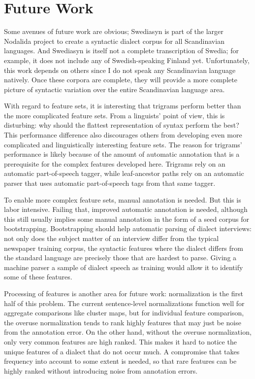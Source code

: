 \section{Future Work}

Some avenues of future work are obvious; Swediasyn is part of the
larger Nodalida project to create a syntactic dialect corpus for all
Scandinavian languages. And Swediasyn is itself not a complete
transcription of Swedia; for example, it does not include any of
Swedish-speaking Finland yet. Unfortunately, this work depends on
others since I do not speak any Scandinavian language natively. Once
these corpora are complete, they will provide a more complete picture
of syntactic variation over the entire Scandinavian language area.

With regard to feature sets, it is interesting that trigrams perform better
than the more complicated feature sets. From a linguists' point of
view, this is disturbing: why should the flattest representation of
syntax perform the best? This performance difference also
discourages others from developing even more complicated and
linguistically interesting feature sets. The reason for trigrams'
performance is likely because of the amount of automatic annotation
that is a prerequisite for the complex features developed
here. Trigrams rely on an automatic part-of-speech tagger, while
leaf-ancestor paths rely on an automatic parser that uses automatic
part-of-speech tags from that same tagger.

To enable more complex feature sets, manual annotation is needed. But
this is labor intensive. Failing that, improved automatic annotation
is needed, although this still usually implies some manual annotation
in the form of a seed corpus for bootstrapping. Bootstrapping should
help automatic parsing of dialect interviews: not only does the
subject matter of an interview differ from the typical newspaper
training corpus, the syntactic features where the dialect differs from
the standard language are precisely those that are hardest to
parse. Giving a machine parser a sample of dialect speech as training
would allow it to identify some of these features.

Processing of features is another area for future work: normalization
is the first half of this problem. The current sentence-level
normalizations function well for aggregate comparisons like cluster
maps, but for individual feature comparison, the overuse normalization
tends to rank highly features that may just be noise from the
annotation error. On the other hand, without the overuse
normalization, only very common features are high ranked. This makes
it hard to notice the unique features of a dialect that do not occur
much. A compromise that takes frequency into account to some extent is
needed, so that rare features can be highly ranked without introducing
noise from annotation errors.

